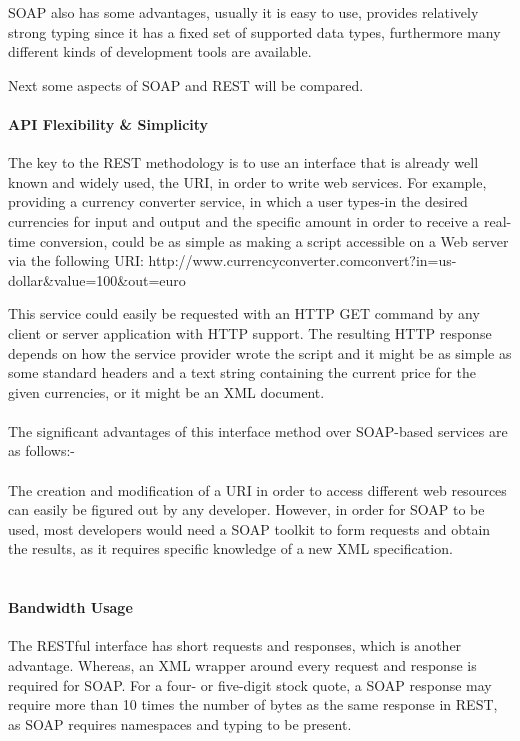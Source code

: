 SOAP also has some advantages, usually it is easy to use, provides relatively strong typing since it has a fixed set of supported data types, furthermore many different kinds of development tools are available.

Next some aspects of SOAP and REST will be compared.

\paragraph{API Flexibility \& Simplicity}

The key to the REST methodology is to use an interface that is already well known and widely used, the URI, in order to write web services. For example, providing a currency converter service, in which a user types-in the desired currencies for input and output and the specific amount in order to receive a real-time conversion, could be as simple as making a script accessible on a Web server via the following URI: http://www.currencyconverter.com\/convert?in=us-dollar\&value=100\&out=euro

This service could easily be requested with an HTTP GET command by any client or server application with HTTP support. The resulting HTTP response depends on how the service provider wrote the script and it might be as simple as some standard headers and a text string containing the current price for the given currencies, or it might be an XML document.
\\
\\
The significant advantages of this interface method over SOAP-based services are as follows:-
\\
\\
The creation and modification of a URI in order to access different web resources can easily be figured out by any developer. However, in order for SOAP to be used, most developers would need a SOAP toolkit to form requests and obtain the results, as it requires specific knowledge of a new XML specification.
\\
\\
\paragraph{Bandwidth Usage}

The RESTful interface has short requests and responses, which is another advantage. Whereas, an XML wrapper around every request and response is required for SOAP. For a four- or five-digit stock quote, a SOAP response may require more than 10 times the number of bytes as the same response in REST, as SOAP requires namespaces and typing to be present. 
\\
\\
